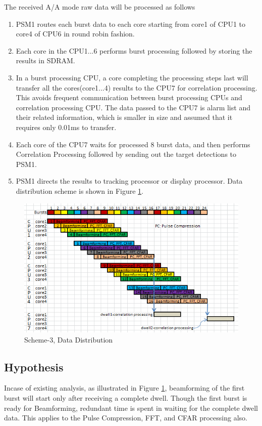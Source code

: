\vspace*{0.2cm}
\noindent
The received A/A mode raw data will be processed as follows

\begin{enumerate}
\item PSM1 routes each burst data to each core starting from core1 of CPU1 to core4 of CPU6 in round robin fashion.
\item Each core in the CPU1...6 performs burst processing followed by storing the results in SDRAM.
\item In a burst processing CPU, a core completing the processing steps last will transfer all the cores(core1...4) results to the CPU7 for correlation processing. This avoids frequent communication between burst processing CPUs and correlation processing CPU. The data passed to the CPU7 is alarm list and their related information, which is smaller in size and assumed that it requires only 0.01ms to transfer.
\item Each core of the CPU7 waits for processed 8 burst data, and then performs Correlation Processing followed by sending out the target detections to PSM1.
\item PSM1 directs the results to tracking processor or display processor. Data distribution scheme is shown in Figure \ref{fig:mm:scheme4_data_distribution}.
\end{enumerate}

\begin{figure}[h!]
	\centering
	\includegraphics[width=140mm]{figures/scheme4_data_distribution.png}
	\caption{Scheme-3, Data Distribution}
	\label{fig:mm:scheme4_data_distribution}
\end{figure}

\subsection{Hypothesis}
Incase of existing analysis, as illustrated in Figure \ref{fig:mm:scheme4_data_distribution}, beamforming of the first burst will start only after receiving a complete dwell. Though the first burst is ready for Beamforming, redundant time is spent in waiting for the complete dwell data. This applies to the Pulse Compression, FFT, and CFAR processing also.

